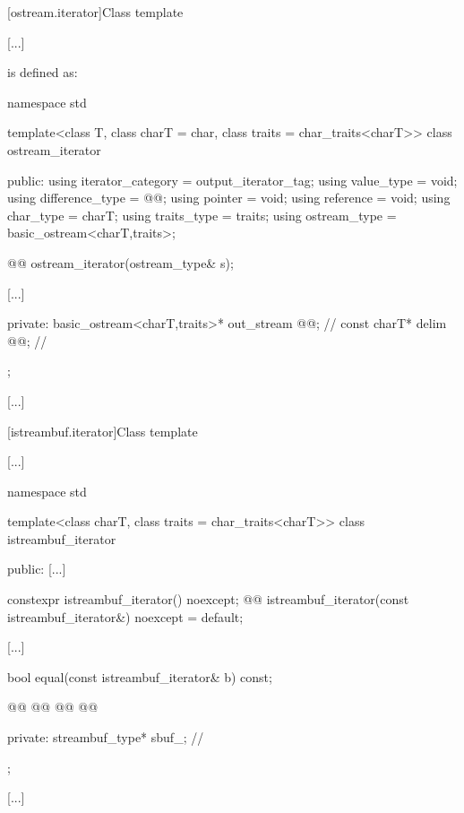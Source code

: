 \begin{itemdescr}
\pnum
\returns
{}
\end{itemdescr}

[ostream.iterator]{Class template }

[...]

\setcounter{Paras}{1}
\pnum {} is defined as:

\begin{codeblock}
namespace std {
  template<class T, class charT = char, class traits = char_traits<charT>>
  class ostream_iterator {
  public:
    using iterator_category = output_iterator_tag;
    using value_type        = void;
    using difference_type   = @@;
    using pointer           = void;
    using reference         = void;
    using char_type         = charT;
    using traits_type       = traits;
    using ostream_type      = basic_ostream<charT,traits>;

    @@
    ostream_iterator(ostream_type& s);

    [...]

  private:
    basic_ostream<charT,traits>* out_stream @@;  // \expos
    const charT* delim @@;                       // \expos
  };
}
\end{codeblock}

[...]

[istreambuf.iterator]{Class template }

[...]

%
\begin{codeblock}
namespace std {
  template<class charT, class traits = char_traits<charT>>
  class istreambuf_iterator {
  public:
    [...]

    constexpr istreambuf_iterator() noexcept;
    @@
    istreambuf_iterator(const istreambuf_iterator&) noexcept = default;

    [...]

    bool equal(const istreambuf_iterator& b) const;

    @@
    @@
    @@
    @@

  private:
    streambuf_type* sbuf_;                // \expos
  };

  [...]
}
\end{codeblock}

